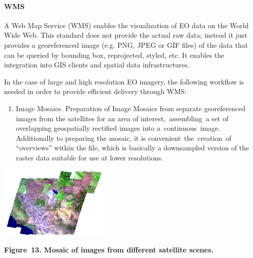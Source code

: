 \documentclass[a4paper]{article}
\newcounter{saveenum}
\newcommand\liststyleLFOxxi{%
\renewcommand\theenumi{\arabic{enumi}}
\renewcommand\theenumii{\alph{enumii}}
\renewcommand\theenumiii{\roman{enumiii}}
\renewcommand\theenumiv{\arabic{enumiv}}
\renewcommand\labelenumi{\theenumi.}
\renewcommand\labelenumii{\theenumii.}
\renewcommand\labelenumiii{\theenumiii.}
\renewcommand\labelenumiv{\theenumiv.}
}
\begin{document}
\paragraph[WMS]{WMS}
A Web Map Service (WMS) enables the visualization of EO data on the
World Wide Web. This standard does not provide the actual raw data;
instead it just provides a georeferenced image (e.g. PNG, JPEG or GIF
files) of the data that can be queried by bounding box, reprojected,
styled, etc. It enables the integration into GIS clients and spatial
data infrastructures.

In the case of large and high resolution EO imagery, the following
workflow is needed in order to provide efficient delivery through WMS:

\liststyleLFOxxi
\setcounter{saveenum}{\value{enumi}}
\begin{enumerate}
\setcounter{enumi}{\value{saveenum}}
\item Image Mosaics. Preparation of Image Mosaics from separate
georeferenced images from the satellites for an area of
interest,\ assembling\ a set of overlapping geospatially rectified
images into a\ continuous\ image. Additionally to preparing the mosaic,
it is convenient\ the\ creation\ of
{\textquotedblleft}overviews{\textquotedblright} within the file, which
is basically a downsampled version of the raster data suitable for use
at lower resolutions.\ 
\end{enumerate}
{\centering 
\includegraphics[width=2.08145in,height=1.36709in]{out-img17.png} \par}

{\centering\bfseries
Figure\ 13. Mosaic of images from different satellite scenes.\ 
\par}
\end{document}
